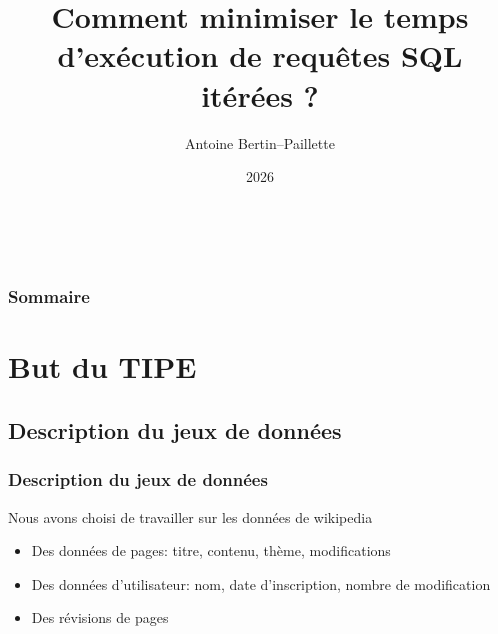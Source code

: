 \documentclass[a4paper,12pt]{beamer}
\title{Comment minimiser le temps d’exécution de requêtes SQL itérées ?}
\author[Eliott P. \& Antoine BP]{Antoine Bertin--Paillette}
\date{2026}
\begin{document}
\begin{frame}
    \titlepage\
\end{frame}
\begin{frame}
    \frametitle{Sommaire}
    \tableofcontents[hideallsubsections]
\end{frame}

\section{But du TIPE}

\subsection{Description du jeux de données}

\begin{frame}
    \frametitle{Description du jeux de données}

  \begin{block}{Nous avons choisi de travailler sur les données de wikipedia}
    \begin{itemize}
        \item  Des données de pages: titre, contenu, thème, modifications
        \item  Des données d'utilisateur: nom, date d'inscription, nombre de modification
        \item  Des révisions de pages
    \end{itemize}
    \end{block}


\end{frame}
\end{document}
